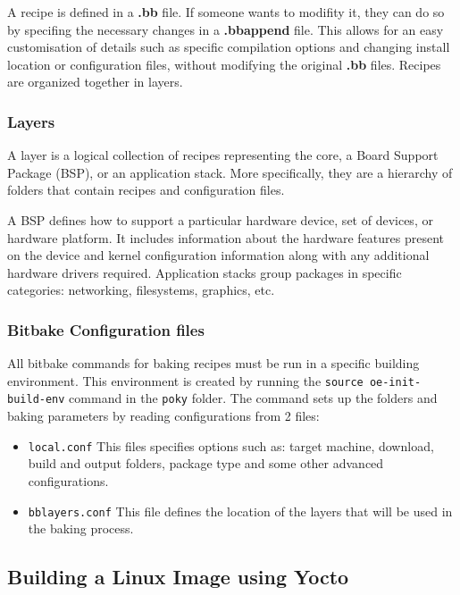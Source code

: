 A recipe is defined in a \textbf{.bb} file. If someone wants to modifity it, they can do so by specifing the necessary changes in a \textbf{.bbappend} file. This allows for an easy customisation of details such as specific compilation options and changing install location or configuration files, without modifying the original \textbf{.bb} files. Recipes are organized together in layers.

\subsubsection{Layers}

A layer is a logical collection of recipes representing the core, a Board Support Package (BSP), or an application stack. More specifically, they are a hierarchy of folders that contain recipes and configuration files. 

A BSP defines how to support a particular hardware device, set of devices, or hardware platform. It includes information about the hardware features present on the device and kernel configuration information along with any additional hardware drivers required. Application stacks group packages in specific categories: networking, filesystems, graphics, etc.

\subsubsection{Bitbake Configuration files}

All bitbake commands for baking recipes must be run in a specific building environment. This environment is created by running the \texttt{source oe-init-build-env} command in the \texttt{poky} folder. The command sets up the folders and baking parameters by reading configurations from 2 files:
\begin{itemize}
  \item \texttt{local.conf} This files specifies options such as: target machine, download, build and output folders, package type and some other advanced configurations.
  \item \texttt{bblayers.conf} This file defines the location of the layers that will be used in the baking process.
\end{itemize}

\subsection{Building a Linux Image using Yocto}

